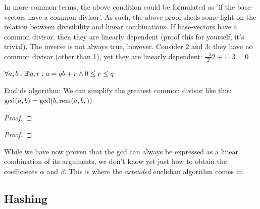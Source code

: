 In more common terms, the above condition could be formulated as 'if the base-vectors have a common divisor'. As such, the above proof sheds some light on the relation between divisibility and linear combinations. If base-vectors have a common divisor, then they are linearly dependent (proof this for yourself, it's trivial). The inverse is not always true, however. Consider $2$ and $3$: they have no common divisor (other than 1), yet they are linearly dependent: $\frac{-3}{2}2 + 1 \cdot 3 = 0$

\begin{theorem}
	$ \forall a,b: \exists ! q, r: a = qb + r \land 0 \leq r \leq q $
\end{theorem}

\begin{theorem}	
    Euclids algorithm: We can simplify the greatest common divisor like this: $  \text{gcd}(a,b)  =  \text{gcd}(b, \text{rem}(a,b,))   $
\end{theorem}

\begin{proof}
\end{proof}


\begin{proof}
\end{proof}

While we have now proven that the gcd can always be expressed as a linear combination of its arguments, we don't know yet just how to obtain the coefficients $\alpha$ and $\beta$. This is where the \emph{extended} euclidian algorithm comes in. 




\subsection{Hashing}

